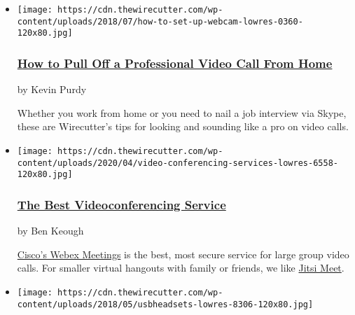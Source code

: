 \begin{itemize}
\item
  \href{https://www.nytimes.com/wirecutter/blog/professional-video-call-from-home/}{}

  \texttt{[image: https://cdn.thewirecutter.com/wp-content/uploads/2018/07/how-to-set-up-webcam-lowres-0360-120x80.jpg]}

  \hypertarget{how-to-pull-off-a-professional-video-call-from-home}{%
  \subsubsection{\texorpdfstring{\href{https://www.nytimes.com/wirecutter/blog/professional-video-call-from-home/}{How
  to Pull Off a Professional Video Call From
  Home}}{How to Pull Off a Professional Video Call From Home}}\label{how-to-pull-off-a-professional-video-call-from-home}}

  by Kevin Purdy

  Whether you work from home or you need to nail a job interview via
  Skype, these are Wirecutter's tips for looking and sounding like a pro
  on video calls.
\item
  \href{https://www.nytimes.com/wirecutter/reviews/best-video-conferencing-service/}{}

  \texttt{[image: https://cdn.thewirecutter.com/wp-content/uploads/2020/04/video-conferencing-services-lowres-6558-120x80.jpg]}

  \hypertarget{the-best-videoconferencing-service}{%
  \subsubsection{\texorpdfstring{\href{https://www.nytimes.com/wirecutter/reviews/best-video-conferencing-service/}{The
  Best Videoconferencing
  Service}}{The Best Videoconferencing Service}}\label{the-best-videoconferencing-service}}

  by Ben Keough

  \href{https://www.nytimes.com/wirecutter/out/link/33677/0/4/96921/}{Cisco's
  Webex Meetings} is the best, most secure service for large group video
  calls. For smaller virtual hangouts with family or friends, we like
  \href{https://www.nytimes.com/wirecutter/out/link/38238/161522/4/113593/?merchant=Jitsi}{Jitsi
  Meet}.
\item
  \href{https://www.nytimes.com/wirecutter/reviews/best-usb-office-headset/}{}

  \texttt{[image: https://cdn.thewirecutter.com/wp-content/uploads/2018/05/usbheadsets-lowres-8306-120x80.jpg]}


\end{itemize}
